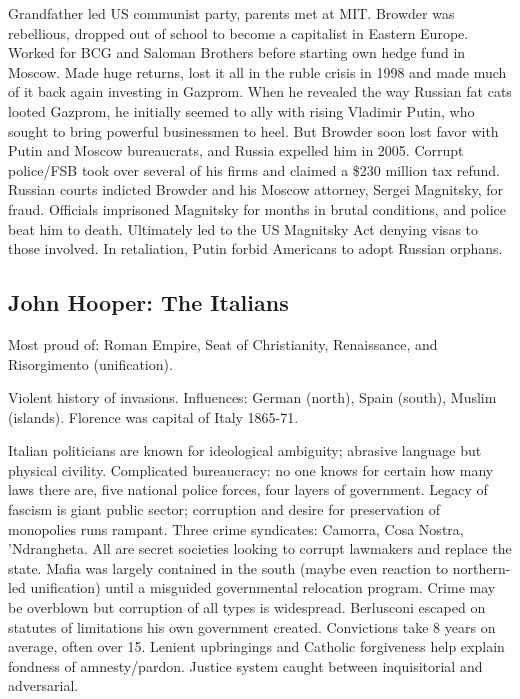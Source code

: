 \documentclass[
]{article}
\begin{document}
Grandfather led US communist party, parents met at MIT. Browder was
rebellious, dropped out of school to become a capitalist in Eastern
Europe. Worked for BCG and Saloman Brothers before starting own hedge
fund in Moscow. Made huge returns, lost it all in the ruble crisis in
1998 and made much of it back again investing in Gazprom. When he
revealed the way Russian fat cats looted Gazprom, he initially seemed to
ally with rising Vladimir Putin, who sought to bring powerful
businessmen to heel. But Browder soon lost favor with Putin and Moscow
bureaucrats, and Russia expelled him in 2005. Corrupt police/FSB took
over several of his firms and claimed a \$230 million tax refund.
Russian courts indicted Browder and his Moscow attorney, Sergei
Magnitsky, for fraud. Officials imprisoned Magnitsky for months in
brutal conditions, and police beat him to death. Ultimately led to the
US Magnitsky Act denying visas to those involved. In retaliation, Putin
forbid Americans to adopt Russian orphans.

\hypertarget{john-hooper-the-italians}{%
\subsection{John Hooper: The Italians}\label{john-hooper-the-italians}}

Most proud of: Roman Empire, Seat of Christianity, Renaissance, and
Risorgimento (unification).

Violent history of invasions. Influences: German (north), Spain (south),
Muslim (islands). Florence was capital of Italy 1865-71.

Italian politicians are known for ideological ambiguity; abrasive
language but physical civility. Complicated bureaucracy: no one knows
for certain how many laws there are, five national police forces, four
layers of government. Legacy of fascism is giant public sector;
corruption and desire for preservation of monopolies runs rampant. Three
crime syndicates: Camorra, Cosa Nostra, 'Ndrangheta. All are secret
societies looking to corrupt lawmakers and replace the state. Mafia was
largely contained in the south (maybe even reaction to northern-led
unification) until a misguided governmental relocation program. Crime
may be overblown but corruption of all types is widespread. Berlusconi
escaped on statutes of limitations his own government created.
Convictions take 8 years on average, often over 15. Lenient upbringings
and Catholic forgiveness help explain fondness of amnesty/pardon.
Justice system caught between inquisitorial and adversarial.
\end{document}
